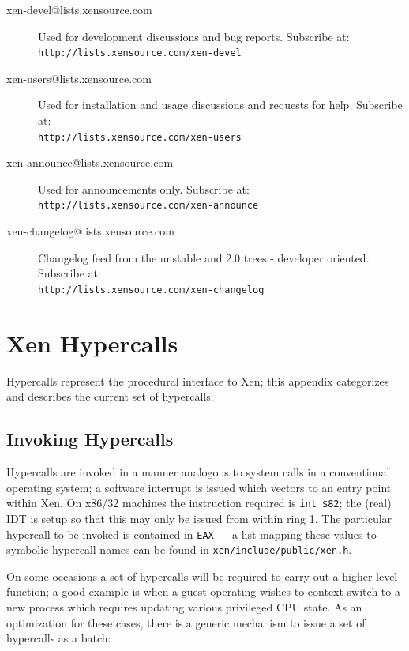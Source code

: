 \documentclass[11pt,twoside,final,openright]{report}
\begin{document}
\begin{description}
\item[xen-devel@lists.xensource.com] Used for development
  discussions and bug reports.  Subscribe at: \\
  {\small {\tt http://lists.xensource.com/xen-devel}}
\item[xen-users@lists.xensource.com] Used for installation and usage
  discussions and requests for help.  Subscribe at: \\
  {\small {\tt http://lists.xensource.com/xen-users}}
\item[xen-announce@lists.xensource.com] Used for announcements only.
  Subscribe at: \\
  {\small {\tt http://lists.xensource.com/xen-announce}}
\item[xen-changelog@lists.xensource.com] Changelog feed
  from the unstable and 2.0 trees - developer oriented.  Subscribe at: \\
  {\small {\tt http://lists.xensource.com/xen-changelog}}
\end{description}

\appendix


\chapter{Xen Hypercalls}
\label{a:hypercalls}

Hypercalls represent the procedural interface to Xen; this appendix 
categorizes and describes the current set of hypercalls. 

\section{Invoking Hypercalls} 

Hypercalls are invoked in a manner analogous to system calls in a
conventional operating system; a software interrupt is issued which
vectors to an entry point within Xen. On x86/32 machines the
instruction required is {\tt int \$82}; the (real) IDT is setup so
that this may only be issued from within ring 1. The particular 
hypercall to be invoked is contained in {\tt EAX} --- a list 
mapping these values to symbolic hypercall names can be found 
in {\tt xen/include/public/xen.h}. 

On some occasions a set of hypercalls will be required to carry
out a higher-level function; a good example is when a guest 
operating wishes to context switch to a new process which 
requires updating various privileged CPU state. As an optimization
for these cases, there is a generic mechanism to issue a set of 
hypercalls as a batch: 
\end{document}
